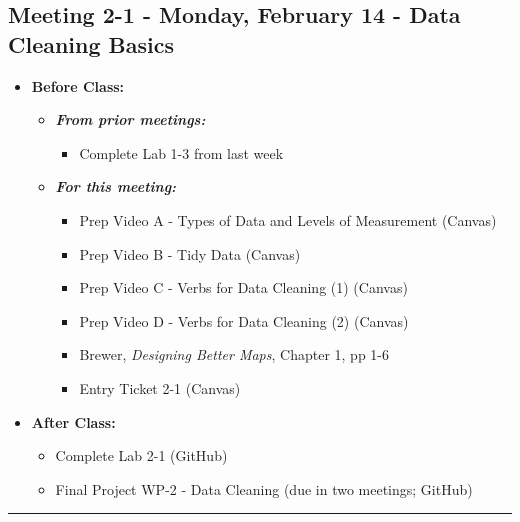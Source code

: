 \documentclass[
]{book}
\providecommand{\tightlist}{%
  \setlength{\itemsep}{0pt}\setlength{\parskip}{0pt}}
\begin{document}
\hypertarget{meeting-2-1---monday-february-14---data-cleaning-basics}{%
\subsection*{Meeting 2-1 - Monday, February 14 - Data Cleaning Basics}\label{meeting-2-1---monday-february-14---data-cleaning-basics}}

\begin{itemize}
\tightlist
\item
  \textbf{Before Class:}

  \begin{itemize}
  \tightlist
  \item
    \textbf{\emph{From prior meetings:}}

    \begin{itemize}
    \tightlist
    \item
      Complete Lab 1-3 from last week
    \end{itemize}
  \item
    \textbf{\emph{For this meeting:}}

    \begin{itemize}
    \tightlist
    \item
      Prep Video A - Types of Data and Levels of Measurement (Canvas)
    \item
      Prep Video B - Tidy Data (Canvas)
    \item
      Prep Video C - Verbs for Data Cleaning (1) (Canvas)
    \item
      Prep Video D - Verbs for Data Cleaning (2) (Canvas)
    \item
      Brewer, \emph{Designing Better Maps}, Chapter 1, pp 1-6
    \item
      Entry Ticket 2-1 (Canvas)
    \end{itemize}
  \end{itemize}
\item
  \textbf{After Class:}

  \begin{itemize}
  \tightlist
  \item
    Complete Lab 2-1 (GitHub)
  \item
    Final Project WP-2 - Data Cleaning (due in two meetings; GitHub)
  \end{itemize}
\end{itemize}

\begin{center}\rule{0.5\linewidth}{0.5pt}\end{center}
\end{document}
